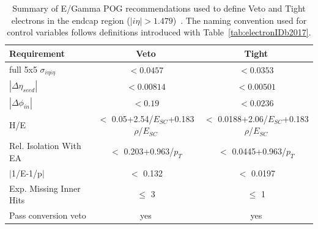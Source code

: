 \begin{table}[h]
\footnotesize
\centering
\begin{tabular}{|l|c|c|}
\hline\hline
Requirement    & Veto  & Tight             \\\hline
full 5x5 $\sigma_{i\eta i\eta}$ &  $< 0.0457$ &   $< 0.0353$    \\
$|\Delta\eta_{seed}|$ & $< 0.00814$ & $< 0.00501$ \\
$|\Delta\phi_{in}|$ & $< 0.19$ & $< 0.0236$ \\
H/E & $<$ 0.05+2.54/$E_{SC}$+0.183$\rho$/$E_{SC}$ & $<$ 0.0188+2.06/$E_{SC}$+0.183$\rho$/$E_{SC}$ \\
Rel. Isolation With EA & $<$ 0.203+0.963/$p_T$	& $<$ 0.0445+0.963/$p_T$\\
$|$1/E-1/p$|$ & $<$ 0.132	& $<$ 0.0197\\
Exp. Missing Inner Hits & $\leq$ 3&	 $\leq$ 1\\
Pass conversion veto & yes	& yes \\
\hline\hline
\end{tabular}
\caption{Summary of E/Gamma POG recommendations used to define Veto and Tight electrons in the endcap region ($|i\eta|> 1.479$)~\cite{twiki_egamma_1,twiki_egamma_2,note:AN_19_257}. The naming convention used for control variables follows definitions introduced with Table~\ref{tab:electronIDb2017}. }
\label{tab:electronIDe2017}
\end{table}

